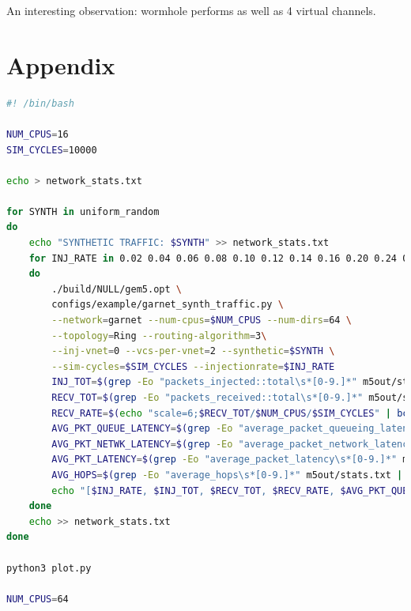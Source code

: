 \documentclass{article}
\begin{document}
An interesting observation: wormhole performs as well as 4 virtual channels.

\section*{Appendix}
\begin{lstlisting}[language=bash]
#! /bin/bash

NUM_CPUS=16
SIM_CYCLES=10000

echo > network_stats.txt

for SYNTH in uniform_random 
do
	echo "SYNTHETIC TRAFFIC: $SYNTH" >> network_stats.txt
	for INJ_RATE in 0.02 0.04 0.06 0.08 0.10 0.12 0.14 0.16 0.20 0.24 0.28 0.32 0.40 0.48 0.56 0.64 0.72 0.80
	do
		./build/NULL/gem5.opt \
		configs/example/garnet_synth_traffic.py \
		--network=garnet --num-cpus=$NUM_CPUS --num-dirs=64 \
		--topology=Ring --routing-algorithm=3\
		--inj-vnet=0 --vcs-per-vnet=2 --synthetic=$SYNTH \
		--sim-cycles=$SIM_CYCLES --injectionrate=$INJ_RATE
		INJ_TOT=$(grep -Eo "packets_injected::total\s*[0-9.]*" m5out/stats.txt | grep -Eo "[0-9.]*")
		RECV_TOT=$(grep -Eo "packets_received::total\s*[0-9.]*" m5out/stats.txt | grep -Eo "[0-9.]*")
		RECV_RATE=$(echo "scale=6;$RECV_TOT/$NUM_CPUS/$SIM_CYCLES" | bc)
		AVG_PKT_QUEUE_LATENCY=$(grep -Eo "average_packet_queueing_latency\s*[0-9.]*" m5out/stats.txt | grep -Eo "[0-9.]*")
		AVG_PKT_NETWK_LATENCY=$(grep -Eo "average_packet_network_latency\s*[0-9.]*" m5out/stats.txt | grep -Eo "[0-9.]*")
		AVG_PKT_LATENCY=$(grep -Eo "average_packet_latency\s*[0-9.]*" m5out/stats.txt | grep -Eo "[0-9.]*")
		AVG_HOPS=$(grep -Eo "average_hops\s*[0-9.]*" m5out/stats.txt | grep -Eo "[0-9.]*")
		echo "[$INJ_RATE, $INJ_TOT, $RECV_TOT, $RECV_RATE, $AVG_PKT_QUEUE_LATENCY, $AVG_PKT_NETWK_LATENCY, $AVG_PKT_LATENCY, $AVG_HOPS]" >> network_stats.txt
	done
	echo >> network_stats.txt
done

python3 plot.py

NUM_CPUS=64


\end{lstlisting}
\end{document}
